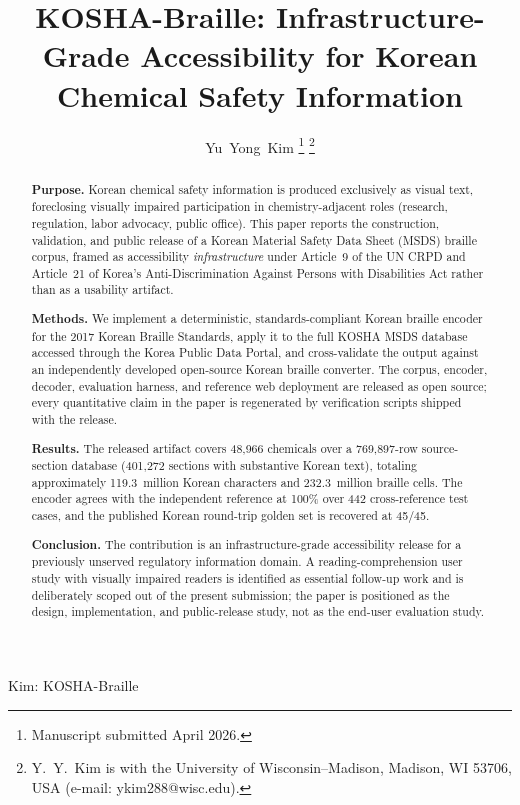 \documentclass[journal]{IEEEtran}
\begin{document}
\title{KOSHA-Braille: Infrastructure-Grade Accessibility for Korean Chemical Safety Information}

\author{Yu~Yong~Kim
\thanks{Manuscript submitted April 2026.}
\thanks{Y.~Y.~Kim is with the University of Wisconsin--Madison, Madison, WI 53706, USA (e-mail: ykim288@wisc.edu).}
}

{Kim: KOSHA-Braille}

\begin{abstract}
\textbf{Purpose.} Korean chemical safety information is produced exclusively as visual text, foreclosing visually impaired participation in chemistry-adjacent roles (research, regulation, labor advocacy, public office). This paper reports the construction, validation, and public release of a Korean Material Safety Data Sheet (MSDS) braille corpus, framed as accessibility \emph{infrastructure} under Article~9 of the UN CRPD and Article~21 of Korea's Anti-Discrimination Against Persons with Disabilities Act rather than as a usability artifact.

\textbf{Methods.} We implement a deterministic, standards-compliant Korean braille encoder for the 2017 Korean Braille Standards, apply it to the full KOSHA MSDS database accessed through the Korea Public Data Portal, and cross-validate the output against an independently developed open-source Korean braille converter. The corpus, encoder, decoder, evaluation harness, and reference web deployment are released as open source; every quantitative claim in the paper is regenerated by verification scripts shipped with the release.

\textbf{Results.} The released artifact covers 48{,}966 chemicals over a 769{,}897-row source-section database (401{,}272 sections with substantive Korean text), totaling approximately 119.3~million Korean characters and 232.3~million braille cells. The encoder agrees with the independent reference at 100\% over 442 cross-reference test cases, and the published Korean round-trip golden set is recovered at 45/45.

\textbf{Conclusion.} The contribution is an infrastructure-grade accessibility release for a previously unserved regulatory information domain. A reading-comprehension user study with visually impaired readers is identified as essential follow-up work and is deliberately scoped out of the present submission; the paper is positioned as the design, implementation, and public-release study, not as the end-user evaluation study.
\end{abstract}
\end{document}
